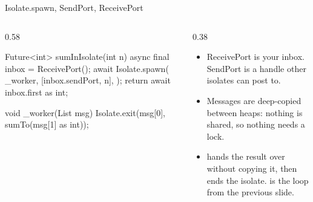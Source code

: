 \documentclass[10pt,aspectratio=169,t]{beamer}
\begin{document}
\begin{frame}[fragile,eyebrow=Isolates]{Isolate.spawn, SendPort, ReceivePort}
  \begin{columns}[T]
    \begin{column}{0.58\textwidth}
\begin{dart}
Future<int> sumInIsolate(int n) async {
  final inbox = ReceivePort();
  await Isolate.spawn(
    _worker,
    [inbox.sendPort, n],
  );
  return await inbox.first as int;
}

void _worker(List msg) {
  Isolate.exit(msg[0], sumTo(msg[1] as int));
}
\end{dart}
    \end{column}
    \begin{column}{0.38\textwidth}
      \begin{itemize}
        \item ReceivePort is your inbox. SendPort is a handle other isolates can post to.
        \item Messages are deep-copied between heaps: nothing is shared, so nothing needs a lock.
        \item {} hands the result over without copying it, then ends the isolate.  is the loop from the previous slide.
      \end{itemize}
    \end{column}
  \end{columns}
\end{frame}
\end{document}
